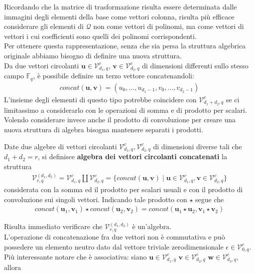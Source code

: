 Ricordando che la matrice di trasformazione risulta essere determinata dalle immagini degli elementi della base come vettori colonna, risulta più efficace considerare gli elementi di $\mathcal{Q}$ non come vettori di polinomi, ma come vettori di vettori i cui coefficienti sono quelli dei polinomi corrispondenti. \\
Per ottenere questa rappresentazione, senza che sia persa la struttura algebrica originale abbiamo bisogno di definire una nuova struttura.\\
Da due vettori circolanti $\mathbf{u} \in \mathcal{V}_{d_{1}, q}^{c} $, $\mathbf{v} \in \mathcal{V}_{d_{2}, q}^{c} $ di dimensioni differenti sullo stesso campo $\mathbb{F}_{q}$, è possibile definire un terzo vettore concatenandoli:
\begin{align*}
   concat(\mathbf{u},\mathbf{v}) = (u_0,\dots,u_{d_{1} - 1}, v_0,\dots, v_{d_{2} - 1} )
\end{align*}
L'insieme degli elementi di questo tipo potrebbe coincidere con $\mathcal{V}_{d_{1}+d_{2}, q}^{c} $ se ci limitassimo a considerarlo con le operazioni di somma e di prodotto per scalari. Volendo considerare invece anche il prodotto di convoluzione per creare una nuova struttura di algebra bisogna mantenere separati i prodotti.
\begin{definizione}
   Date due algebre di vettori circolanti $\mathcal{V}_{d_{1}, q}^{c} , \mathcal{V}_{d_{2}, q}^{c} $ di dimensioni diverse tali che $d_{1} + d_{2} = r$, si definisce {\bf algebra dei vettori circolanti concatenati} la struttura
   \begin{align*}
      \mathcal{V}_{r,q}^{(d_{1},d_{2})} = \mathcal{V}_{d_{1}, q}^{c} \coprod \mathcal{V}_{d_{2}, q}^{c}
      = \lbrace concat(\mathbf{u},\mathbf{v}) \mid \mathbf{u} \in \mathcal{V}_{d_{1}, q}^{c},  \mathbf{v} \in \mathcal{V}_{d_{2}, q}^{c} \rbrace
   \end{align*}
   considerata con la somma ed il prodotto per scalari usuali e con il prodotto di convoluzione sui singoli vettori. Indicando tale prodotto con $\star$ segue che
   \begin{align*}
      concat(\mathbf{u}_{1},\mathbf{v}_{1}) \star concat(\mathbf{u}_{2},\mathbf{v}_{2})
          = concat(\mathbf{u}_{1} \star \mathbf{u}_{2},\mathbf{v}_{1}\star \mathbf{v}_{2} )
   \end{align*}
\end{definizione}
\noindent
Risulta immediato verificare che $\mathcal{V}_{r,q}^{(d_{1},d_{2})}$ è un'algebra. \\
L'operazione di concatenazione fra due vettori non è commutativa e può possedere un elemento neutro dato dal vettore triviale zerodimensionale $\epsilon \in \mathcal{V}_{0, q}^{c} $. Più interessante notare che è associativa: siano  $\mathbf{u} \in \mathcal{V}_{d_{1}, q}^{c} $  $\mathbf{v} \in \mathcal{V}_{d_{2}, q}^{c} $  $\mathbf{w} \in \mathcal{V}_{d_{3}, q}^{c} $, allora
